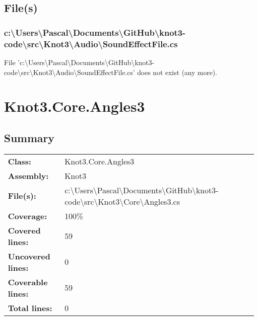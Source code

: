 \documentclass[a4paper,10pt]{article}
\begin{document}
\subsection{File(s)}
\subsubsection{c:\textbackslash Users\textbackslash Pascal\textbackslash Documents\textbackslash GitHub\textbackslash knot3-code\textbackslash src\textbackslash Knot3\textbackslash Audio\textbackslash SoundEffectFile.cs}
 File 'c:\textbackslash Users\textbackslash Pascal\textbackslash Documents\textbackslash GitHub\textbackslash knot3-code\textbackslash src\textbackslash Knot3\textbackslash Audio\textbackslash SoundEffectFile.cs' does not exist (any more).
\newpage
\section{Knot3.Core.Angles3}
\subsection{Summary}
\begin{longtable}[l]{ll}
\textbf{Class:} & Knot3.Core.Angles3\\
\textbf{Assembly:} & Knot3\\
\textbf{File(s):} & \begin{minipage}[t]{12cm}{c:\textbackslash Users\textbackslash Pascal\textbackslash Documents\textbackslash GitHub\textbackslash knot3-code\textbackslash src\textbackslash Knot3\textbackslash Core\textbackslash Angles3.cs}\end{minipage} \\
\textbf{Coverage:} & 100\%\\
\textbf{Covered lines:} & 59\\
\textbf{Uncovered lines:} & 0\\
\textbf{Coverable lines:} & 59\\
\textbf{Total lines:} & 0\\
\end{longtable}
\end{document}
